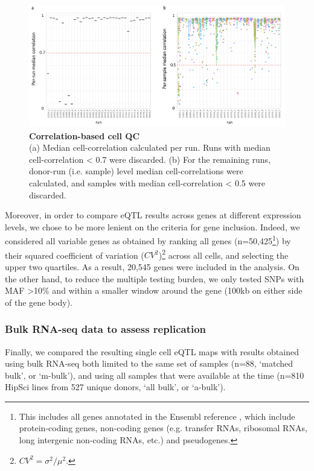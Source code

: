 \begin{figure}[h]
\centering
\includegraphics[width=15cm]{Chapter3/Fig/sc_eqtl_cell_QC.png}
\caption[Correlation-based cell QC]{\textbf{Correlation-based cell QC}\\
(a) Median cell-correlation calculated per run.
Runs with median cell-correlation < 0.7 were discarded.
(b) For the remaining runs, donor-run (i.e. sample) level median cell-correlations were calculated, and samples with median cell-correlation < 0.5 were discarded.}
\label{fig:sc_eqtl_autocorrelation}
\end{figure}

Moreover, in order to compare eQTL results across genes at different expression levels, we chose to be more lenient on the criteria for gene inclusion.
Indeed, we considered all variable genes as obtained by ranking all genes (n=50,425\footnote{This includes all genes annotated in the Ensembl reference \cite{yates2020ensembl}, which include protein-coding genes, non-coding genes (e.g. transfer RNAs, ribosomal RNAs, long intergenic non-coding RNAs, etc.) and pseudogenes.}) by their squared coefficient of variation ($CV^2$)\footnote{$CV^2=\sigma^2/\mu^2$.} across all cells, and selecting the upper two quartiles.
As a result, 20,545 genes were included in the analysis. 
On the other hand, to reduce the multiple testing burden, we only tested SNPs with MAF >10\% and within a smaller window around the gene (100kb on either side of the gene body).

\subsubsection{Bulk RNA-seq data to assess replication}

Finally, we compared the resulting single cell eQTL maps with results obtained using bulk RNA-seq both limited to the same set of samples (n=88, `matched bulk', or `m-bulk'), and using all samples that were available at the time (n=810 HipSci lines from 527 unique donors, `all bulk', or `a-bulk'). 

